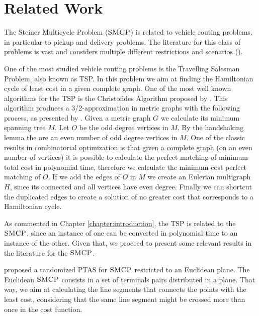 \chapter{Related Work}
\label{chapter:related_work}

The Steiner Multicycle Problem (\(\textsc{SMCP}\)) is related to vehicle routing problems, in particular to pickup and delivery problems. The literature for this class of problems is vast and considers multiple different restrictions and scenarios (\cite{surveyRouter}).

One of the most studied vehicle routing problems is the Travelling Salesman Problem, also known as TSP. In this problem we aim at finding the Hamiltonian cycle of least cost in a given complete graph. One of the most well known algorithms for the TSP is the Christofides Algorithm proposed by \cite{Christofides2022WorstCaseAO}. This algorithm produces a 3/2-approximation in metric graphs with the following process, as presented by \cite{williamsonApxAlgs}. Given a metric graph \(G\) we calculate its minimum spanning tree \(M\). Let \(O\) be the odd degree vertices in \(M\). By the handshaking lemma the are an even number of odd degree vertices in \(M\). One of the classic results in combinatorial optimization is that given a complete graph (on an even number of vertices) it is possible to calculate the perfect matching of minimum total cost in polynomial time, therefore we calculate the minimum cost perfect matching of \(O\). If we add the edges of \(O\) in \(M\) we create an Eulerian multigraph \(H\), since its connected and all vertices have even degree. Finally we can shortcut the duplicated edges to create a solution of no greater cost that corresponds to a Hamiltonian cycle.

As commented in Chapter \ref{chapter:introduction}, the TSP is related to the \(\textsc{SMCP}\), since an instance of one can be converted in polynomial time to an instance of the other. Given that, we proceed to present some relevant results in the literature for the \(\textsc{SMCP}\).

\cite{LINTZMAYER2020134} proposed a randomized PTAS for \(\textsc{SMCP}\) restricted to an Euclidean plane. The Euclidean \(\textsc{SMCP}\) consists in a set of terminals pairs distributed in a plane. That way, we aim at calculating the line segments that connects the points with the least cost, considering that the same line segment might be crossed more than once in the cost function.



